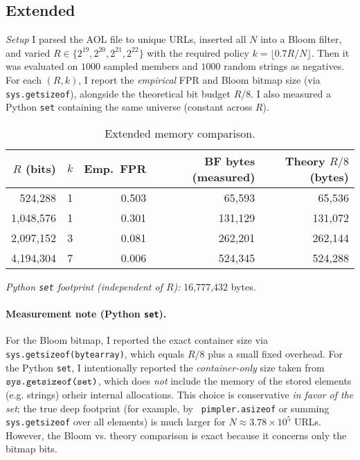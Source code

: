 \documentclass[11pt]{article}
\begin{document}
\subsection*{Extended}
\emph{Setup} I parsed the AOL file to unique URLs, inserted all $N$ into a Bloom filter, and varied $R\!\in\!\{2^{19},2^{20},2^{21},2^{22}\}$ with the required policy $k=\lfloor 0.7R/N\rfloor$. Then it was evaluated on $1000$ sampled members and $1000$ random strings as negatives. For each $(R,k)$, I report the \emph{empirical} FPR and Bloom bitmap size (via \verb|sys.getsizeof|), alongside the theoretical bit budget $R/8$. I also measured a Python \texttt{set} containing the same universe (constant across $R$).

\begin{table}[h]
  \centering
  \begin{tabular}{rrrrr}
    \toprule
    $R$ (bits) & $k$ & Emp.\ FPR & BF bytes (measured) & Theory $R/8$ (bytes) \\
    \midrule
     524{,}288  &  1 & 0.503 &  65{,}593 &   65{,}536 \\
   1{,}048{,}576 &  1 & 0.301 & 131{,}129 &  131{,}072 \\
   2{,}097{,}152 &  3 & 0.081 & 262{,}201 &  262{,}144 \\
   4{,}194{,}304 &  7 & 0.006 & 524{,}345 &  524{,}288 \\
    \bottomrule
  \end{tabular}
  \caption{Extended memory comparison.}
\end{table}

\noindent\textit{Python \texttt{set} footprint (independent of $R$):} 16{,}777{,}432 bytes.

\paragraph{Measurement note (Python \texttt{set}).}
For the Bloom bitmap, I reported the exact container size via \verb|sys.getsizeof(bytearray)|, which equals \(R/8\) plus a small fixed overhead.
For the Python \texttt{set}, I intentionally reported the \emph{container-only} size taken from \(\verb|sys.getsizeof(set)|\), which does \emph{not} include the memory of the stored elements
(e.g. strings) orheir internal allocations. This choice is conservative \emph{in favor of the set};
the true deep footprint (for example, by \texttt{ pimpler.asizeof} or summing \verb|sys.getsizeof| over all elements) is much larger for \(N\!\approx\!3.78\times 10^5\) URLs.
However, the Bloom vs. theory comparison is exact because it concerns only the bitmap bits.
\end{document}
